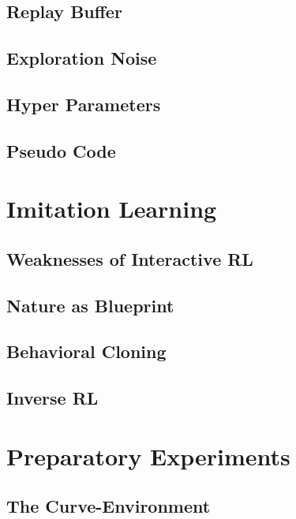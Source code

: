     \subsection{Replay Buffer}
    
    \subsection{Exploration Noise}
    
    \subsection{Hyper Parameters}
    
    \subsection{Pseudo Code} \label{subchap:pseudo}
    
    
\newpage
\section{Imitation Learning}
    
        \subsection{Weaknesses of Interactive RL}
         \label{subchap:weak}
        \subsection{Nature as Blueprint}
        
        \subsection{Behavioral Cloning}
        
        \subsection{Inverse RL}
        
\newpage
\section{Preparatory Experiments} \label{chap:synthetic}

    \subsection{The Curve-Environment}
        
